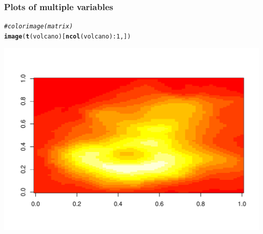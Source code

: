 \documentclass[12pt]{beamer}\usepackage[]{graphicx}\usepackage[]{color}
\makeatletter
\newcommand{\hlnum}[1]{\textcolor[rgb]{0.686,0.059,0.569}{#1}}%
\newcommand{\hlcom}[1]{\textcolor[rgb]{0.678,0.584,0.686}{\textit{#1}}}%
\newcommand{\hlopt}[1]{\textcolor[rgb]{0,0,0}{#1}}%
\newcommand{\hlstd}[1]{\textcolor[rgb]{0.345,0.345,0.345}{#1}}%
\newcommand{\hlkwd}[1]{\textcolor[rgb]{0.737,0.353,0.396}{\textbf{#1}}}%
\newenvironment{kframe}{%
 \def\at@end@of@kframe{}%
 \ifinner\ifhmode%
  \def\at@end@of@kframe{\end{minipage}}%
  \begin{minipage}{\columnwidth}%
 \fi\fi%
 \def\FrameCommand##1{\hskip\@totalleftmargin \hskip-\fboxsep
 \colorbox{shadecolor}{##1}\hskip-\fboxsep
     \hskip-\linewidth \hskip-\@totalleftmargin \hskip\columnwidth}%
 \MakeFramed {\advance\hsize-\width
   \@totalleftmargin\z@ \linewidth\hsize
   \@setminipage}}%
 {\par\unskip\endMakeFramed%
 \at@end@of@kframe}
\newenvironment{knitrout}{}{} %
\makeatother
\begin{document}
\begin{frame}[fragile]
\frametitle{Plots of multiple variables}
\begin{knitrout}\footnotesize
{}\color{fgcolor}\begin{kframe}
\begin{alltt}
\hlcom{# color image (matrix)}
\hlkwd{image}\hlstd{(}\hlkwd{t}\hlstd{(volcano)[}\hlkwd{ncol}\hlstd{(volcano)}\hlopt{:}\hlnum{1}\hlstd{, ])}
\end{alltt}
\end{kframe}

{\centering \includegraphics[width=.8\linewidth,height=.65\linewidth]{figure/unnamed-chunk-25-1} 

}



\end{knitrout}
\end{frame}

\end{document}
